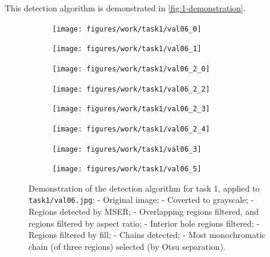 \documentclass{article}
\begin{document}
This detection algorithm is demonstrated in \autoref{fig:1-demonstration}.

\begin{figure}[h]
  \centering
  \begin{subfigure}[t]{0.22\textwidth}
    \centering
    \texttt{[image: figures/work/task1/val06\_0]}
    \caption[]{}
    \label{fig:work-1-0}
  \end{subfigure}
  \begin{subfigure}[t]{0.22\textwidth}
    \centering
    \texttt{[image: figures/work/task1/val06\_1]}
    \caption[]{}
    \label{fig:work-1-1}
  \end{subfigure}
  \begin{subfigure}[t]{0.22\textwidth}
    \centering
    \texttt{[image: figures/work/task1/val06\_2\_0]}
    \caption[]{}
    \label{fig:work-1-2}
  \end{subfigure}
  \begin{subfigure}[t]{0.22\textwidth}
    \centering
    \texttt{[image: figures/work/task1/val06\_2\_2]}
    \caption[]{}
    \label{fig:work-1-3}
  \end{subfigure}

  \begin{subfigure}[t]{0.22\textwidth}
    \centering
    \texttt{[image: figures/work/task1/val06\_2\_3]}
    \caption[]{}
    \label{fig:work-1-4}
  \end{subfigure}
  \begin{subfigure}[t]{0.22\textwidth}
    \centering
    \texttt{[image: figures/work/task1/val06\_2\_4]}
    \caption[]{}
    \label{fig:work-1-5}
  \end{subfigure}
  \begin{subfigure}[t]{0.22\textwidth}
    \centering
    \texttt{[image: figures/work/task1/val06\_3]}
    \caption[]{}
    \label{fig:work-1-6}
  \end{subfigure}
  \begin{subfigure}[t]{0.22\textwidth}
    \centering
    \texttt{[image: figures/work/task1/val06\_5]}
    \caption[]{}
    \label{fig:work-1-7}
  \end{subfigure}

  \caption[Task 1 - Detection Algorithm Demonstration]{
    Demonstration of the detection algorithm for task 1, applied to
    \lstinline{task1/val06.jpg}:
    \protect{} - Original image;
    \protect{} - Coverted to grayscale;
    \protect{} - Regions detected by MSER;
    \protect{} - Overlapping regions filtered, and regions
    filtered by aspect ratio;
    \protect{} - Interior hole regions filtered;
    \protect{} - Regions filtered by fill;
    \protect{} - Chains detected;
    \protect{} - Most monochromatic chain (of three regions)
    selected (by Otsu separation).
  }
  \label{fig:1-demonstration}
\end{figure}
\end{document}
